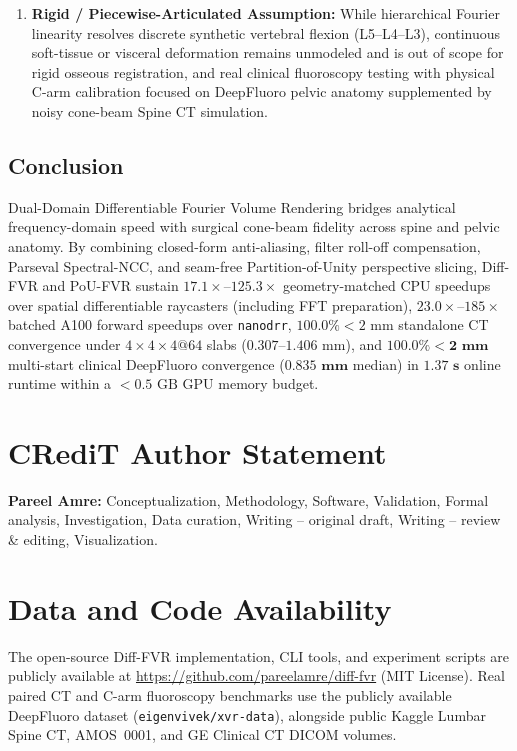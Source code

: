 \documentclass[review,12pt]{elsarticle}
\begin{document}
\begin{enumerate}
    \item \textbf{Rigid / Piecewise-Articulated Assumption:} While hierarchical Fourier linearity resolves discrete synthetic vertebral flexion (L5--L4--L3), continuous soft-tissue or visceral deformation remains unmodeled and is out of scope for rigid osseous registration, and real clinical fluoroscopy testing with physical C-arm calibration focused on DeepFluoro pelvic anatomy supplemented by noisy cone-beam Spine CT simulation.
\end{enumerate}

\subsection{Conclusion}
Dual-Domain Differentiable Fourier Volume Rendering bridges analytical frequency-domain speed with surgical cone-beam fidelity across spine and pelvic anatomy. By combining closed-form anti-aliasing, filter roll-off compensation, Parseval Spectral-NCC, and seam-free Partition-of-Unity perspective slicing, Diff-FVR and PoU-FVR sustain $17.1\times$--$125.3\times$ geometry-matched CPU speedups over spatial differentiable raycasters (including FFT preparation), $23.0\times$--$185\times$ batched A100 forward speedups over \texttt{nanodrr}, $100.0\% <2\text{ mm}$ standalone CT convergence under $4{\times}4{\times}4@64$ slabs ($0.307\text{--}1.406\text{ mm}$), and $\mathbf{100.0\% <2\text{ mm}}$ multi-start clinical DeepFluoro convergence ($\mathbf{0.835\text{ mm}}$ median) in $\mathbf{1.37\text{ s}}$ online runtime within a $<0.5\text{ GB}$ GPU memory budget.


\section*{CRediT Author Statement}
\textbf{Pareel Amre:} Conceptualization, Methodology, Software, Validation, Formal analysis, Investigation, Data curation, Writing -- original draft, Writing -- review \& editing, Visualization.

\section*{Data and Code Availability}
The open-source Diff-FVR implementation, CLI tools, and experiment scripts are publicly available at \url{https://github.com/pareelamre/diff-fvr} (MIT License). Real paired CT and C-arm fluoroscopy benchmarks use the publicly available DeepFluoro dataset (\texttt{eigenvivek/xvr-data}), alongside public Kaggle Lumbar Spine CT, AMOS~0001, and GE Clinical CT DICOM volumes.
\end{document}
